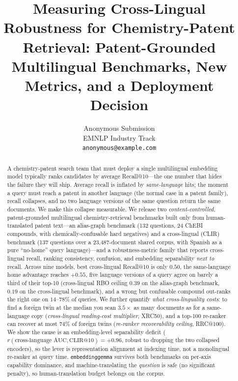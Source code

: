 \documentclass[11pt]{article}
\title{Measuring Cross-Lingual Robustness for Chemistry-Patent Retrieval:
Patent-Grounded Multilingual Benchmarks, New Metrics, and a Deployment Decision}
\author{Anonymous Submission \\
  EMNLP Industry Track \\
  \texttt{anonymous@example.com}}
\begin{document}
\maketitle

\begin{abstract}
A chemistry-patent search team that must deploy a single multilingual
embedding model typically ranks candidates by average Recall@10---the one
number that hides the failure they will ship. Average recall is inflated by
\emph{same-language} hits; the moment a query must reach a patent in another
language (the normal case in a patent family), recall collapses, and no two
language versions of the same question return the same documents. We make this
collapse measurable. We release two \emph{content-controlled},
patent-grounded multilingual chemistry-retrieval benchmarks built only from
human-translated patent text---an alias-graph benchmark (132 questions, 24
ChEBI compounds, with chemically-confusable hard negatives) and a cross-lingual
(CLIR) benchmark (137 questions over a 23{,}487-document shared corpus, with
Spanish as a pure ``no-home'' query language)---and a robustness-metric family
that reports cross-lingual recall, ranking consistency, confusion, and
embedding separability \emph{next to} recall. Across nine models, best
cross-lingual Recall@10 is only $0.50$, the same-language home advantage
reaches $+0.55$, five language versions of a query agree on barely a third of
their top-10 (cross-lingual RBO ceiling $0.39$ on the alias-graph benchmark,
$0.19$ on the cross-lingual benchmark), and a wrong but confusable compound
out-ranks the right one on $14$--$78\%$ of queries. We further quantify
\emph{what cross-linguality costs}: to find a foreign twin at the median you
scan $3.5\times$ as many documents as for a same-language copy
(\emph{cross-lingual reading-cost multiplier}, XRC50), and a top-100 re-ranker
can recover at most $74\%$ of foreign twins (\emph{re-ranker recoverability
ceiling}, RRC@100). We show the cause is an embedding-level separability
deficit ($r(\text{cross-language AUC},\text{CLIR@10})=+0.96$, robust to dropping
the two collapsed encoders), so the lever is representation alignment at
indexing time, not a monolingual re-ranker at query time. \texttt{embeddinggemma}
survives both benchmarks on per-axis capability dominance, and
machine-translating the \emph{question} is safe (no significant penalty), so
human-translation budget belongs on the corpus.
\end{abstract}

\end{document}
